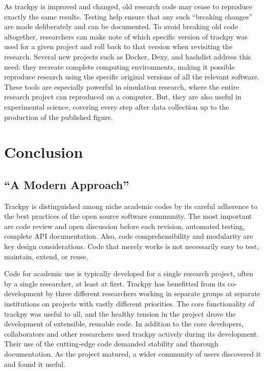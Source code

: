 As trackpy is improved and changed, old research code may cease to reproduce exactly the same results. Testing help ensure that any such ``breaking changes'' are made deliberately and can be documented. To avoid breaking old code altogether, researchers can make note of which specific version of trackpy was used for a given project and roll back to that version when revisiting the research. Several new projects such as Docker, Dexy, and hashdist address this need: they recreate complete computing environments, making it possible reproduce research using the specific original versions of all the relevant software. These tools are especially powerful in simulation research, where the entire research project can reproduced on a computer. But, they are also useful in experimental science, covering every step after data collection up to the production of the published figure.

\section{Conclusion}
\subsection{``A Modern Approach''}
Trackpy is distinguished among niche academic codes by its careful adherence to the best practices of the open source software community\cite{Wilson2014a}. The most important are code review and open discussion before each revision, automated testing, complete API documentation. Also, code comprehensibility and modularity are key design considerations. Code that merely works is not necessarily easy to test, maintain, extend, or reuse.

Code for academic use is typically developed for a single research project, often by a single researcher, at least at first. Trackpy has benefitted from its co-development by three different researchers working in separate groups at separate institutions on projects with vastly different priorities. The core functionality of trackpy was useful to all, and the healthy tension in the project drove the development of extensible, reusable code. In addition to the core developers, collaborators and other researchers used trackpy actively during its development. Their use of the cutting-edge code demanded stability and thorough documentation. As the project matured, a wider community of users discovered it and found it useful.

